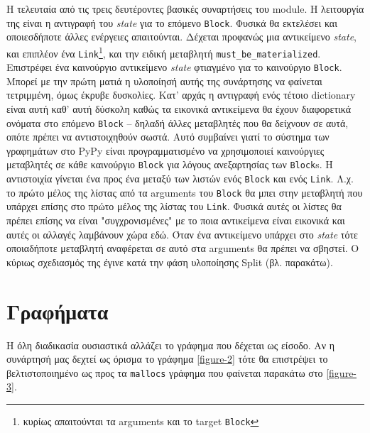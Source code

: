 Η τελευταία από τις τρεις δευτέροντες βασικές συναρτήσεις του module. Η
λειτουργία της είναι η αντιγραφή του \textit{state} για το επόμενο
\texttt{Block}. Φυσικά θα εκτελέσει και οποιεσδήποτε άλλες ενέργειες
απαιτούνται. Δέχεται προφανώς μια αντικείμενο \textit{state}, και επιπλέον ένα
\texttt{Link}\footnote{κυρίως απαιτούνται τα arguments και το target
\texttt{Block}}, και την ειδική μεταβλητή \texttt{must\_be\_materialized}.
Επιστρέφει ένα καινούργιο αντικείμενο \textit{state} φτιαγμένο για το καινούργιο
\texttt{Block}. Μπορεί με την πρώτη ματιά η υλοποίησή αυτής της συνάρτησης να
φαίνεται τετριμμένη, όμως έκρυβε δυσκολίες. Κατ' αρχάς η αντιγραφή ενός τέτοιο
dictionary είναι αυτή καθ' αυτή δύσκολη καθώς τα εικονικά αντικείμενα θα έχουν
διαφορετικά ονόματα στο επόμενο \texttt{Block} – δηλαδή άλλες μεταβλητές που θα
δείχνουν σε αυτά, οπότε πρέπει να αντιστοιχηθούν σωστά. Αυτό συμβαίνει γιατί το
σύστημα των γραφημάτων στο PyPy είναι προγραμματισμένο να χρησιμοποιεί
καινούργιες μεταβλητές σε κάθε καινούργιο \texttt{Block} για λόγους ανεξαρτησίας
των \texttt{Block}s. Η αντιστοιχία γίνεται ένα προς ένα μεταξύ των λιστών ενός
\texttt{Block} και ενός \texttt{Link}. Λ.χ. το πρώτο μέλος της λίστας από τα
arguments του \texttt{Block} θα μπει στην μεταβλητή που υπάρχει επίσης στο πρώτο
μέλος της λίστας του \texttt{Link}. Φυσικά αυτές οι λίστες θα πρέπει επίσης να
είναι "συγχρονισμένες" με το ποια αντικείμενα είναι εικονικά και αυτές οι
αλλαγές λαμβάνουν χώρα εδώ. Όταν ένα αντικείμενο υπάρχει στο \textit{state} τότε
οποιαδήποτε μεταβλητή αναφέρεται σε αυτό στα arguments θα πρέπει να σβηστεί. Ο
κύριως σχεδιασμός της έγινε κατά την φάση υλοποίησης Split (βλ. παρακάτω).


\section{Γραφήματα}

Η όλη διαδικασία ουσιαστικά αλλάζει το γράφημα που δέχεται ως είσοδο. Αν η
συνάρτησή μας δεχτεί ως όρισμα το γράφημα \ref{figure-2} τότε θα επιστρέψει το
βελτιστοποιημένο ως προς τα \texttt{mallocs} γράφημα που φαίνεται παρακάτω στο
\ref{figure-3}.


